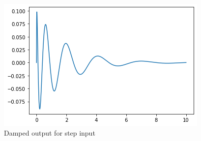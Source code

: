 \begin{enumerate}[label=\thesection.\arabic*.,ref=\thesection.\theenumi]
\begin{figure}
    \centering
    \includegraphics[width=0.7\linewidth]{unitstepdamping.png}
    \caption{Damped output for step input}
    \label{fig:Graph}
\end{figure}
\end{enumerate}

